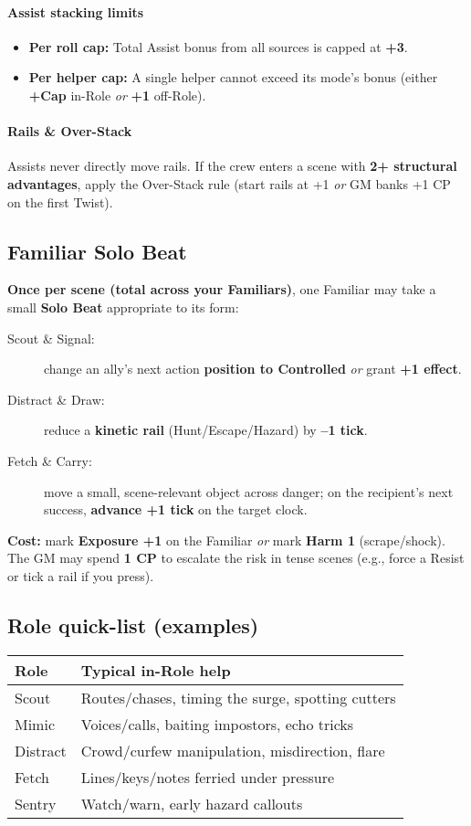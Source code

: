 \documentclass[12pt]{article}
\begin{document}
\paragraph{Assist stacking limits}
\begin{itemize}
  \item \textbf{Per roll cap:} Total Assist bonus from all sources is capped at \textbf{+3}.
  \item \textbf{Per helper cap:} A single helper cannot exceed its mode’s bonus (either \textbf{+Cap} in-Role \emph{or} \textbf{+1} off-Role).
\end{itemize}

\paragraph{Rails \& Over-Stack}
Assists never directly move rails. If the crew enters a scene with \textbf{2+ structural advantages}, apply the Over-Stack rule (start rails at +1 \emph{or} GM banks +1 CP on the first \spadesuit{} Twist).

\subsection*{Familiar Solo Beat}
\textbf{Once per scene (total across your Familiars)}, one Familiar may take a small \textbf{Solo Beat} appropriate to its form:

\begin{description}
  \item[Scout \& Signal:] change an ally’s next action \textbf{position to Controlled} \emph{or} grant \textbf{+1 effect}.
  \item[Distract \& Draw:] reduce a \textbf{kinetic rail} (Hunt/Escape/Hazard) by \textbf{--1 tick}.
  \item[Fetch \& Carry:] move a small, scene-relevant object across danger; on the recipient’s next success, \textbf{advance +1 tick} on the target clock.
\end{description}

\noindent \textbf{Cost:} mark \textbf{Exposure +1} on the Familiar \emph{or} mark \textbf{Harm 1} (scrape/shock). The GM may spend \textbf{1 CP} to escalate the risk in tense scenes (e.g., force a Resist or tick a rail if you press).

\subsection*{Role quick-list (examples)}
\begin{tabular}{@{}l l@{}}
\toprule
\textbf{Role} & \textbf{Typical in-Role help} \\
\midrule
Scout & Routes/chases, timing the surge, spotting cutters \\
Mimic & Voices/calls, baiting impostors, echo tricks \\
Distract & Crowd/curfew manipulation, misdirection, flare \\
Fetch & Lines/keys/notes ferried under pressure \\
Sentry & Watch/warn, early hazard callouts \\
\bottomrule
\end{tabular}
\end{document}
